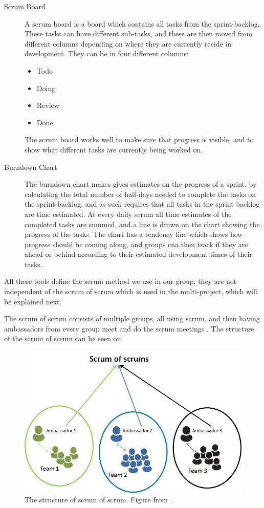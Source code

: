 \begin{description}
	\item[Scrum Board] A scrum board is a board which contains all tasks from the sprint-backlog.
	These tasks can have different sub-tasks, and these are then moved from different columns depending on where they are currently recide in development.
	They can be in four different columns:
	\begin{itemize}
		\item Todo
		\item Doing
		\item Review
		\item Done
	\end{itemize}
	The scrum board works well to make sure that progress is visible, and to show what different tasks are currently being worked on.
	\item[Burndown Chart] The burndown chart makes gives estimates on the progress of a sprint, by calculating the total number of half-days needed to complete the tasks on the sprint-backlog, and as such requires that all tasks in the sprint backlog are time estimated.
	At every daily scrum all time estimates of the completed tasks are summed, and a line is drawn on the chart showing the progress of the tasks.
	The chart has a tendency line which shows how progress should be coming along, and groups cna then track if they are ahead or behind according to their estimated development times of their tasks.
\end{description}

All these tools define the scrum method we use in our group, they are not independent of the scrum of scrum which is used in the multi-project, which will be explained next.

The scrum of scrum consists of multiple groups, all using scrum, and then having ambassadors from every group meet and do the scrum meetings \cite{SCRUMBOOK}.
The structure of the scrum of scrum can be seen on 

\begin{figure}
\centering
\includegraphics[scale=0.4]{figures/scrumofscrum.png}
\caption{The structure of scrum of scrum. Figure from \cite{scrumofscrumfigure}.}
\label{fig:scrumofscrum}
\end{figure}

